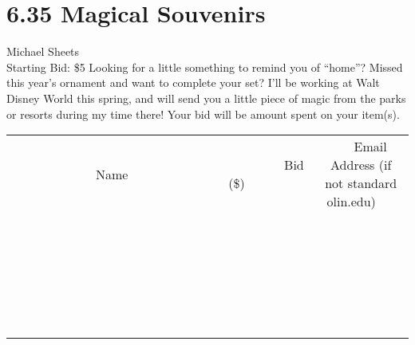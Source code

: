 \documentclass[11pt]{article}
\begin{document}
\section*{6.35 Magical Souvenirs}
Michael Sheets
\\
Starting Bid: \$5
\newline
Looking for a little something to remind you of “home”? Missed this year’s ornament and want to complete your set? I’ll be working at Walt Disney World this spring, and will send you a little piece of magic from the parks or resorts during my time there! Your bid will be amount spent on your item(s).
\\[6ex]
\begin{tabular}{c c c}
~~~~~~~~~~~~~Name~~~~~~~~~~~~~ & ~~~~~~~~~Bid (\$)~~~~~~~~~  & ~~~Email Address (if not standard olin.edu)~~~\\
 & & \\
\hline
 & & \\
\hline
 & & \\
\hline
 & & \\
\hline
 & & \\
\hline
 & & \\
\hline
 & & \\
\hline
 & & \\
\hline
 & & \\
\hline
 & & \\
\hline
 & & \\
\hline
 & & \\
\hline
 & & \\
\hline
 & & \\
\hline
 & & \\
\hline
 & & \\
\hline
 & & \\
\hline
 & & \\
\hline
 & & \\
\hline
 & & \\
\hline
 & & \\
\hline
 & & \\
\hline
 & & \\
\hline
 & & \\
\hline
 & & \\
\hline
 & & \\
\hline
\end{tabular}
\newpage
\end{document}
